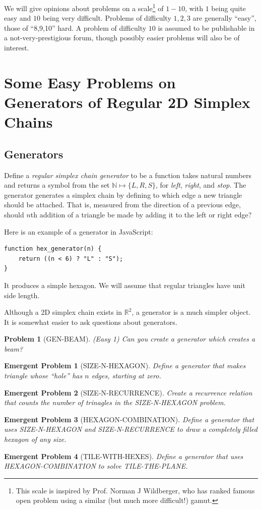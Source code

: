 \documentclass[11pt]{article}
\newtheorem{problem}{Problem}
\newtheorem{eproblem}{Emergent Problem}
\begin{document}
We will give opinions about problems on a scale\footnote{This scale is inspired by Prof. Norman J Wildberger, who has ranked famous open problem using a similar
  (but much more difficult!) gamut.} of $1-10$, with $1$ being quite easy and $10$ being very difficult. Problems of difficulty $1,2,3$
are generally ``easy'', those of ``8,9,10'' hard.  A problem of difficulty $10$ is assumed to be publishable in a not-very-prestigious forum, though
possibly easier problems will also be of interest. 

\section{Some Easy Problems on Generators of Regular 2D Simplex Chains}

\subsection{Generators}

Define a {\em regular simplex chain generator} to be a function takes natural numbers and returns a symbol from the set $\mathbb{N} \mapsto \{L,R,S\}$,
  for {\em left}, {\em right}, and {\em stop}. The generator generates a simplex chain by defining to which edge a new triangle should
  be attached. That is, measured from the direction of a previous edge, should $n$th addition of a triangle be made by adding it
  to the left or right edge?

  Here is an example of a generator in JavaScript:
\begin{verbatim}
function hex_generator(n) {
    return ((n < 6) ? "L" : "S");
}
\end{verbatim}
It produces a simple hexagon. We will assume that regular triangles have unit side length.

Although a 2D simplex chain exists in $\mathbb{R}^2$, a generator is a much simpler object.  It is somewhat easier to ask questions about
generators.

\begin{problem}[GEN-BEAM]
  (Easy 1) Can you create a generator which creates a beam?
\end{problem}

\begin{eproblem}[SIZE-N-HEXAGON]
  Define a generator that makes triangle whose ``hole'' has $n$ edges, starting at zero.
\end{eproblem}
\begin{eproblem}[SIZE-N-RECURRENCE]
  Create a recurrence relation that counts the number of trinagles in the SIZE-N-HEXAGON problem.
\end{eproblem}
\begin{eproblem}[HEXAGON-COMBINATION]
  Define a generator that uses SIZE-N-HEXAGON and SIZE-N-RECURRENCE to draw a completely filled hexagon of any size.
\end{eproblem}
\begin{eproblem}[TILE-WITH-HEXES]
  Define a generator that uses HEXAGON-COMBINATION to solve TILE-THE-PLANE.
\end{eproblem}
\end{document}
